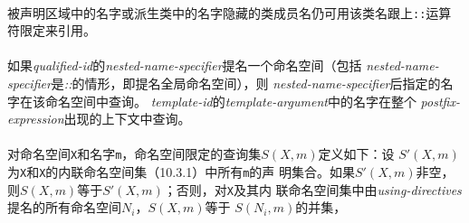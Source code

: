 \paragraph{}
被声明区域中的名字或派生类中的名字隐藏的类成员名仍可用该类名跟上\texttt{::}运算
符限定来引用。

\paragraph{}
如果\textit{qualified-id}的\textit{nested-name-specifier}提名一个命名空间（包括
\textit{nested-name-specifier}是\textit{::}的情形，即提名全局命名空间），则
\textit{nested-name-specifier}后指定的名字在该命名空间中查询。
\textit{template-id}的\textit{template-argument}中的名字在整个
\textit{postfix-expression}出现的上下文中查询。

\paragraph{}
对命名空间\texttt{X}和名字\texttt{m}，命名空间限定的查询集$S(X, m)$定义如下：设
$S'(X, m)$为\texttt{X}和\texttt{X}的内联命名空间集（10.3.1）中所有\texttt{m}的声
明集合。如果$S'(X, m)$非空，则$S(X, m)$等于$S'(X, m)$；否则，对\texttt{X}及其内
联命名空间集中由\textit{using-directives}提名的所有命名空间$N_i$，$S(X, m)$等于
$S(N_i, m)$的并集，

